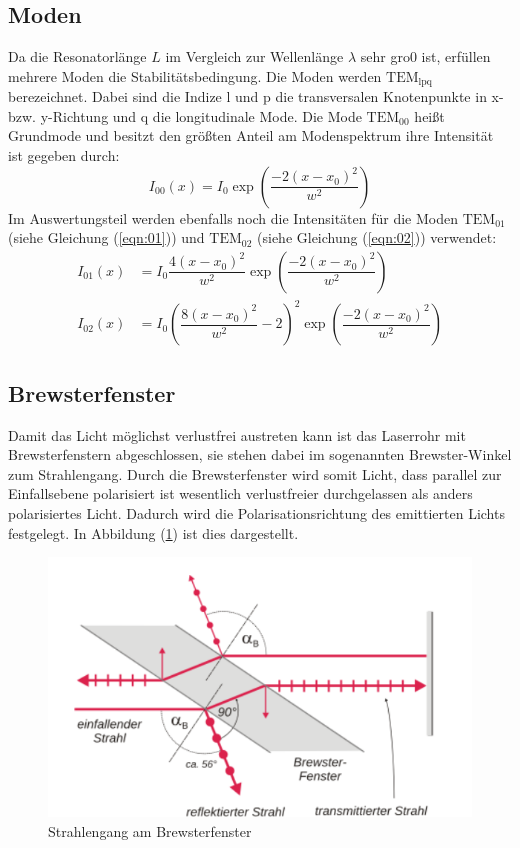 \subsection{Moden}
\label{sec:modee}
Da die Resonatorlänge $L$ im  Vergleich zur Wellenlänge $\lambda$ sehr gro0 ist, erfüllen mehrere Moden die Stabilitätsbedingung. Die Moden werden $\mathrm{TEM}_\mathrm{lpq}$ berezeichnet. Dabei sind die Indize l und p die transversalen Knotenpunkte
in x- bzw. y-Richtung und q die longitudinale Mode. Die Mode $\mathrm{TEM}_\mathrm{00}$ heißt Grundmode und besitzt den größten Anteil am Modenspektrum ihre Intensität ist gegeben durch:
\begin{equation}
  \label{eqn:grundmode}
  I_\mathrm{00}(x)=I_\mathrm{0}\exp\left(\dfrac{-2(x-x_\mathrm{0})^2}{w^2}\right)
\end{equation}
Im Auswertungsteil werden ebenfalls noch die Intensitäten für die Moden $\mathrm{TEM}_\mathrm{01}$ (siehe Gleichung (\ref{eqn:01})) und $\mathrm{TEM}_\mathrm{02}$ (siehe Gleichung (\ref{eqn:02})) verwendet:
\begin{align}
  \label{eqn:01}
  I_\mathrm{01}(x)&=I_\mathrm{0}\dfrac{4(x-x_\mathrm{0})^2}{w^2}\exp\left(\dfrac{-2(x-x_\mathrm{0})^2}{w^2}\right) \\
  \label{eqn:02}
  I_\mathrm{02}(x)&=I_\mathrm{0}\left(\dfrac{8(x-x_\mathrm{0})^2}{w^2}-2\right)^2\exp\left(\dfrac{-2(x-x_\mathrm{0})^2}{w^2}\right)
\end{align}
\subsection{Brewsterfenster}
\label{sec:brews}
Damit das Licht möglichst verlustfrei austreten kann ist das Laserrohr mit Brewsterfenstern abgeschlossen, sie stehen dabei im sogenannten Brewster-Winkel zum Strahlengang. Durch die Brewsterfenster wird somit Licht, dass parallel
zur Einfallsebene polarisiert ist wesentlich verlustfreier durchgelassen als anders polarisiertes Licht. Dadurch wird die Polarisationsrichtung des emittierten Lichts festgelegt. In Abbildung (\ref{fig:brew}) ist dies dargestellt.
\begin{figure}[h!]
  \centering
  \includegraphics[scale=0.5]{fig/brew.png}
  \caption{Strahlengang am Brewsterfenster \cite{Anleitung6}}
  \label{fig:brew}
\end{figure}
